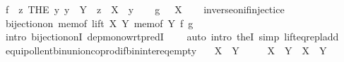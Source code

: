 \begin{isabellebody}
\ {\isacharquery}{\kern0pt}f\ {\isacharequal}{\kern0pt}\ {\isachardoublequoteopen}{\isasymlambda}z{\isachardot}{\kern0pt}\ THE\ y{\isachardot}{\kern0pt}\ y\ {\isasymin}\ Y\ {\isasymand}\ z\ {\isacharequal}{\kern0pt}\ X\ {\isacharplus}{\kern0pt}\ y{\isachardoublequoteclose}\isanewline
\ \ \isamarkupfalse%
\ {\isacharquery}{\kern0pt}g\ {\isacharequal}{\kern0pt}\ {\isachardoublequoteopen}{\isacharparenleft}{\kern0pt}{\isacharparenleft}{\kern0pt}{\isacharplus}{\kern0pt}{\isacharparenright}{\kern0pt}\ X{\isacharparenright}{\kern0pt}{\isachardoublequoteclose}\isanewline
\ \ \isamarkupfalse%
\ inverse{\isacharunderscore}{\kern0pt}on{\isacharunderscore}{\kern0pt}if{\isacharunderscore}{\kern0pt}injectice\ \isamarkupfalse%
\ {\isachardoublequoteopen}bijection{\isacharunderscore}{\kern0pt}on\ {\isacharparenleft}{\kern0pt}mem{\isacharunderscore}{\kern0pt}of\ {\isacharparenleft}{\kern0pt}lift\ X\ Y{\isacharparenright}{\kern0pt}{\isacharparenright}{\kern0pt}\ {\isacharparenleft}{\kern0pt}mem{\isacharunderscore}{\kern0pt}of\ Y{\isacharparenright}{\kern0pt}\ {\isacharquery}{\kern0pt}f\ {\isacharquery}{\kern0pt}g{\isachardoublequoteclose}\isanewline
\ \ \ \ \isamarkupfalse%
\ {\isacharparenleft}{\kern0pt}intro\ bijection{\isacharunderscore}{\kern0pt}onI\ dep{\isacharunderscore}{\kern0pt}mono{\isacharunderscore}{\kern0pt}wrt{\isacharunderscore}{\kern0pt}predI{\isacharparenright}{\kern0pt}\isanewline
\ \ \ \ {\isacharparenleft}{\kern0pt}auto\ intro{\isacharcolon}{\kern0pt}\ the{}I{}\ simp{\isacharcolon}{\kern0pt}\ lift{\isacharunderscore}{\kern0pt}eq{\isacharunderscore}{\kern0pt}repl{\isacharunderscore}{\kern0pt}add{\isacharparenright}{\kern0pt}\isanewline
{}\isamarkupfalse%
%
\endisatagproof
{\isafoldproof}%
%
\isadelimproof
\isanewline
%
\endisadelimproof
\isanewline
{}\isamarkupfalse%
\ equipollent{\isacharunderscore}{\kern0pt}bin{\isacharunderscore}{\kern0pt}union{\isacharunderscore}{\kern0pt}coprod{\isacharunderscore}{\kern0pt}if{\isacharunderscore}{\kern0pt}bin{\isacharunderscore}{\kern0pt}inter{\isacharunderscore}{\kern0pt}eq{\isacharunderscore}{\kern0pt}empty{\isacharcolon}{\kern0pt}\isanewline
\ \ \ {\isachardoublequoteopen}X\ {\isasyminter}\ Y\ {\isacharequal}{\kern0pt}\ {\isacharbraceleft}{\kern0pt}{\isacharbraceright}{\kern0pt}{\isachardoublequoteclose}\isanewline
\ \ \ {\isachardoublequoteopen}X\ {\isasymunion}\ Y\ {\isasymapprox}\ X\ {\isasymCoprod}\ Y{\isachardoublequoteclose}\isanewline
%
\isadelimproof

\end{isabellebody}
